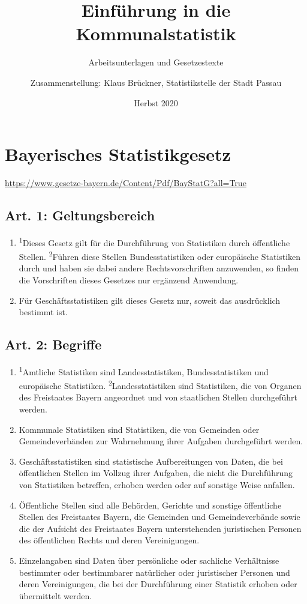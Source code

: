 \documentclass[A4, 12pt]{scrbook}
\title{Einführung in die Kommunalstatistik}
\subtitle{Arbeitsunterlagen und Gesetzestexte}
\author{Zusammenstellung: Klaus Brückner, Statistikstelle der Stadt Passau}
\date{Herbst 2020}
\begin{document}
\maketitle
\tableofcontents




\chapter[BayStatG]{Bayerisches Statistikgesetz}
\newline
\url{https://www.gesetze-bayern.de/Content/Pdf/BayStatG?all=True}
    \section{Art. 1: Geltungsbereich}
        \begin{enumerate}[label=(\arabic*)]
            \item \textsuperscript{1}Dieses Gesetz gilt für die Durchführung von Statistiken durch öffentliche Stellen. \textsuperscript{2}Führen diese Stellen Bundesstatistiken oder europäische Statistiken durch und haben sie dabei andere Rechtsvorschriften anzuwenden, so finden die Vorschriften dieses Gesetzes nur ergänzend Anwendung.
            \item Für Geschäftsstatistiken gilt dieses Gesetz nur, soweit das ausdrücklich bestimmt ist.
        \end{enumerate}
    \section{Art. 2: Begriffe}
        \begin{enumerate}[label=(\arabic*)]
            \item \textsuperscript{1}Amtliche Statistiken sind Landesstatistiken, Bundesstatistiken und europäische Statistiken. \textsuperscript{2}Landesstatistiken sind Statistiken, die von Organen des Freistaates Bayern angeordnet und von staatlichen Stellen durchgeführt werden.
            \item Kommunale Statistiken sind Statistiken, die von Gemeinden oder Gemeindever\-bän\-den zur Wahrnehmung ihrer Aufgaben durchgeführt werden.
            \item Geschäftsstatistiken sind statistische Aufbereitungen von Daten, die bei öffentli\-chen Stellen im Vollzug ihrer Aufgaben, die nicht die Durchführung von Statistiken betreffen, erhoben werden oder auf sonstige Weise anfallen.
            \item Öffentliche Stellen sind alle Behörden, Gerichte und sonstige öffentliche Stellen des Freistaates Bayern, die Gemeinden und Gemeindeverbände sowie die der Aufsicht des Freistaates Bayern unterstehenden juristischen Personen des öffentlichen Rechts und deren Vereinigungen.
            \item Einzelangaben sind Daten über persönliche oder sachliche Verhältnisse bestimmter oder bestimmbarer natürlicher oder juristischer Personen und deren Vereinigungen, die bei der Durchführung einer Statistik erhoben oder übermittelt werden.
        \end{enumerate}
\end{document}
